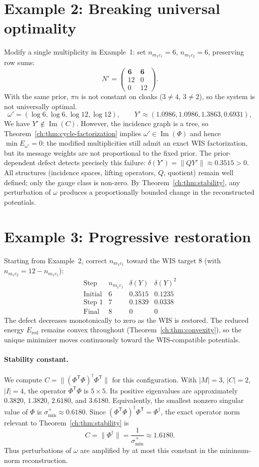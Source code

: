 \section{Example 2: Breaking universal optimality}
Modify a single multiplicity in Example~1: set $n_{m_1c_1}=6$,
$n_{m_1c_2}=6$, preserving row sums:
\[
N'=\begin{pmatrix}\mathbf6&\mathbf6\\12&0\\0&12\end{pmatrix}.
\]
With the same prior, $\pi n$ is not constant on cloaks
($3\neq4$, $3\neq2$), so the system is not universally optimal.
\[
\omega' = (\log6,\log6,\log12,\log12),\qquad
Y' \approx (1.0986,1.0986,1.3863,0.6931),
\]
We have $Y'\notin\operatorname{Im}(C)$.  However, the incidence graph
is a tree, so Theorem~\ref{ch:thm:cycle-factorization}
implies $\omega'\in\operatorname{Im}(\Phi)$ and hence
$\min E_{\omega'}=0$: the modified multiplicities still admit an exact
WIS factorization, but its message weights are not proportional to the
fixed prior.  The prior-dependent defect detects precisely this failure:
$\delta(Y') = \|QY'\| \approx 0.3515 > 0.$
All structures (incidence spaces, lifting operators, $Q$, quotient)
remain well defined; only the gauge class is non-zero.  By
Theorem~\ref{ch:thm:stability}, any perturbation of $\omega$ produces a
proportionally bounded change in the reconstructed potentials.
\section{Example 3: Progressive restoration}
Starting from Example~2, correct $n_{m_1c_1}$ toward the WIS target
$8$ (with $n_{m_1c_2}=12-n_{m_1c_1}$):
\[
\begin{array}{cccc}
\text{Step} & n_{m_1c_1} & \delta(Y) & \delta(Y)^2 \\\hline
\text{Initial} & 6 & 0.3515 & 0.1235 \\
\text{Step 1} & 7 & 0.1839 & 0.0338 \\
\text{Final} & 8 & 0 & 0
\end{array}
\]
The defect decreases monotonically to zero as the WIS is restored.
The reduced energy $E_{\mathrm{red}}$ remains convex throughout
(Theorem~\ref{ch:thm:convexity}), so the unique minimizer moves
continuously toward the WIS-compatible potentials.
\paragraph{Stability constant.}
We compute $C=\|(\Phi^{\mathsf T}\Phi)^\dagger\Phi^{\mathsf T}\|$ for
this configuration.  With $|M|=3$, $|C|=2$, $|I|=4$, the operator
$\Phi^{\mathsf T}\Phi$ is $5\times5$.  Its positive eigenvalues are
approximately $0.3820$, $1.3820$, $2.6180$, and $3.6180$.
Equivalently, the smallest nonzero singular value of $\Phi$ is
$\sigma_{\min}^+\approx0.6180$.  Since
$(\Phi^{\mathsf T}\Phi)^\dagger\Phi^{\mathsf T}=\Phi^\dagger$, the
exact operator norm relevant to Theorem~\ref{ch:thm:stability} is
\[
C=\|\Phi^\dagger\|=\frac{1}{\sigma_{\min}^+}
\approx 1.6180.
\]
Thus perturbations of $\omega$ are amplified by at most this constant
in the minimum-norm reconstruction.
